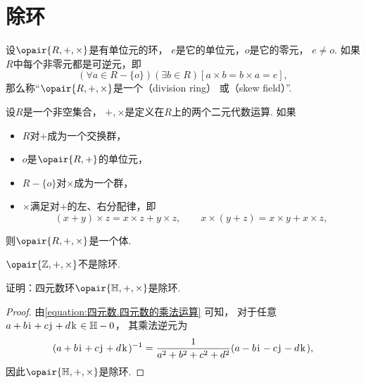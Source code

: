 \section{除环}
\begin{definition}
设\(\opair{R,+,\times}\)是有单位元的环，
\(e\)是它的单位元，\(o\)是它的零元，
\(e \neq o\).
如果\(R\)中每个非零元都是可逆元，即\begin{equation*}
	(\forall a \in R-\{o\})(\exists b \in R)[a \times b = b \times a = e],
\end{equation*}
那么称“\(\opair{R,+,\times}\)是一个（division ring）
或（skew field）”.
\end{definition}

\begin{theorem}
设\(R\)是一个非空集合，
\(+,\times\)是定义在\(R\)上的两个二元代数运算.
如果\begin{itemize}
	\item \(R\)对\(+\)成为一个交换群，
	\item \(o\)是\(\opair{R,+}\)的单位元，
	\item \(R-\{o\}\)对\(\times\)成为一个群，
	\item \(\times\)满足对\(+\)的左、右分配律，即\begin{equation*}
		(x + y) \times z = x \times z + y \times z,
		\qquad
		x \times (y + z) = x \times y + x \times z,
	\end{equation*}
\end{itemize}
则\(\opair{R,+,\times}\)是一个体.
\end{theorem}

\begin{example}
\(\opair{\mathbb{Z},+,\times}\)不是除环.
\end{example}

\begin{example}
证明：四元数环\(\opair{\mathbb{H},+,\times}\)是除环.
\begin{proof}
由\cref{equation:四元数.四元数的乘法运算} 可知，
对于任意\(a+b\kern1pt\mathrm{i}\kern1pt+c\kern1pt\mathrm{j}\kern1pt+d\kern1pt\mathrm{k}\kern1pt\in\mathbb{H}-0\)，
其乘法逆元为\begin{equation*}
	(a+b\kern1pt\mathrm{i}\kern1pt+c\kern1pt\mathrm{j}\kern1pt+d\kern1pt\mathrm{k}\kern1pt)^{-1}
	= \frac1{a^2+b^2+c^2+d^2} (a-b\kern1pt\mathrm{i}\kern1pt-c\kern1pt\mathrm{j}\kern1pt-d\kern1pt\mathrm{k}\kern1pt),
\end{equation*}
因此\(\opair{\mathbb{H},+,\times}\)是除环.
\end{proof}
\end{example}

